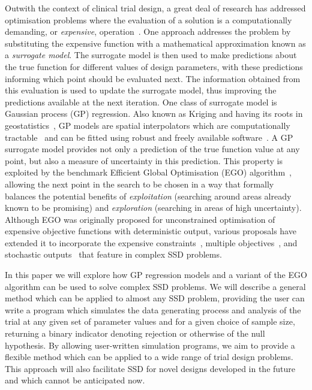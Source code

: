 \documentclass[sagev, Crown]{sagej}
\begin{document}
Outwith the context of clinical trial design, a great deal of research has addressed optimisation problems where the evaluation of a solution is a computationally demanding, or \emph{expensive}, operation~\cite{Sacks1989,Santner2003}. One approach addresses the problem by substituting the expensive function with a mathematical approximation known as a \emph{surrogate model}. The surrogate model is then used to make predictions about the true function for different values of design parameters, with these predictions informing which point should be evaluated next. The information obtained from this evaluation is used to update the surrogate model, thus improving the predictions available at the next iteration. One class of surrogate model is Gaussian process (GP) regression. Also known as Kriging and having its roots in geostatistics~\cite{Krige1951}, GP models are spatial interpolators which are computationally tractable~\cite{Rasmussen2006} and can be fitted using robust and freely available software~\cite{Roustant2012}. A GP surrogate model provides not only a prediction of the true function value at any point, but also a measure of uncertainty in this prediction. This property is exploited by the benchmark Efficient Global Optimisation (EGO) algorithm~\cite{Jones2001}, allowing the next point in the search to be chosen in a way that formally balances the potential benefits of \emph{exploitation} (searching around areas already known to be promising) and \emph{exploration} (searching in areas of high uncertainty). Although EGO was originally proposed for unconstrained optimisation of expensive objective functions with deterministic output, various proposals have extended it to incorporate the expensive constraints~\cite{Sasena2002}, multiple objectives~\cite{Emmerich2011}, and stochastic outputs~\cite{Picheny2014} that feature in complex SSD problems.

In this paper we will explore how GP regression models and a variant of the EGO algorithm can be used to solve complex SSD problems. We will describe a general method which can be applied to almost any SSD problem, providing the user can write a program which simulates the data generating process and analysis of the trial at any given set of parameter values and for a given choice of sample size, returning a binary indicator denoting rejection or otherwise of the null hypothesis. By allowing user-written simulation programs, we aim to provide a flexible method which can be applied to a wide range of trial design problems. This approach will also facilitate SSD for novel designs developed in the future and which cannot be anticipated now.
\end{document}
